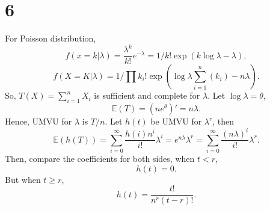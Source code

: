 \documentclass[en,12pt]{elegantpaper}
\begin{document}
    \section*{6}
    \noindent  For Poisson distribution, 
    \[
        f(x=k|\lambda)=\frac{\lambda^k}{k!}e^{-\lambda}=1/k!\exp\left(k\log\lambda-\lambda\right), 
    \]
    \[
        f(X=K|\lambda)=1\Big/\prod k_i!\exp\left(\log\lambda\sum_{i=1}^n(k_i)-n\lambda\right). 
    \]
    So, \(T(X)=\sum_{i=1}^{n} X_{i}\) is sufficient and complete for \(\lambda\). Let $\log\lambda=\theta$, 
    \[
        \mathbb{E}(T)=\left(ne^\theta\right)'=n\lambda. 
    \]
    Hence, UMVU for $\lambda$ is $T/n$. Let $h(t)$ be UMVU for $\lambda^r$, then
    \[
        \mathbb{E}(h(T))=\sum_{i=0}^\infty\frac{h(i)n^i}{i!}\lambda^i=e^{n\lambda}\lambda^r=\sum_{i=0}^\infty\frac{(n\lambda)^i}{i!}\lambda^r. 
    \]
    Then, compare the coefficients for both sides, when $t<r$, 
    \[
        h(t)=0. 
    \]
    But when $t\geqslant r$, 
    \[
        h(t)=\frac{t!}{n^r(t-r)!}. 
    \]
\end{document}
